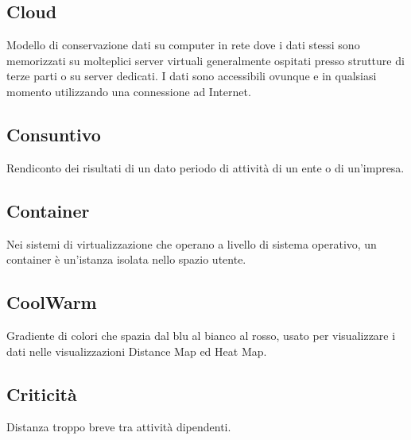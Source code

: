 \documentclass[../glossario.tex]{subfiles}
\begin{document}
\subsection*{Cloud}
{}
Modello di conservazione dati su computer in rete dove i dati stessi sono memorizzati su molteplici server virtuali generalmente ospitati presso strutture di terze parti o su server dedicati. I dati sono accessibili ovunque e in qualsiasi momento utilizzando una connessione ad Internet.

\subsection*{Consuntivo}
{}
Rendiconto dei risultati di un dato periodo di attività di un ente o di un'impresa.

\subsection*{Container}
{}
Nei sistemi di virtualizzazione che operano a livello di sistema operativo, un container è un’istanza isolata nello spazio utente.

\subsection*{CoolWarm}
{}
Gradiente di colori che spazia dal blu al bianco al rosso, usato per visualizzare i dati nelle visualizzazioni Distance Map ed Heat Map.

\subsection*{Criticità}
{}
Distanza troppo breve tra attività dipendenti.
\end{document}
